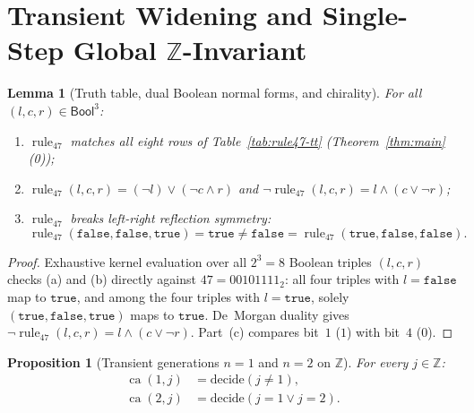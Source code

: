 \documentclass[11pt]{article}
\newtheorem{proposition}[theorem]{Proposition}
\newtheorem{lemma}[theorem]{Lemma}
\theoremstyle{definition}
\newcommand{\Z}{\mathbb{Z}}
\newcommand{\ruleFS}{\operatorname{rule}_{47}}
\newcommand{\ca}{\operatorname{ca}}
\begin{document}
\section{Transient Widening and Single-Step Global \texorpdfstring{$\Z$}{Z}-Invariant}

\begin{lemma}[Truth table, dual Boolean normal forms, and chirality]
\label{lem:rule47}
For all $(l, c, r) \in \mathsf{Bool}^3$:
\begin{enumerate}
\item[\textup{(a)}] $\ruleFS$ matches all eight rows of Table~\ref{tab:rule47-tt} (Theorem~\ref{thm:main}\textup{(0)});
\item[\textup{(b)}] $\ruleFS(l, c, r) = (\neg l) \lor (\neg c \land r)$ and $\neg\ruleFS(l, c, r) = l \land (c \lor \neg r)$;
\item[\textup{(c)}] $\ruleFS$ breaks left-right reflection symmetry:
\[
\ruleFS(\mathtt{false}, \mathtt{false}, \mathtt{true}) = \mathtt{true} \ne \mathtt{false} = \ruleFS(\mathtt{true}, \mathtt{false}, \mathtt{false}).
\]
\end{enumerate}
\end{lemma}

\begin{proof}
Exhaustive kernel evaluation over all $2^3 = 8$ Boolean triples $(l, c, r)$ checks (a) and (b) directly against $47 = 00101111_2$: all four triples with $l = \mathtt{false}$ map to $\mathtt{true}$, and among the four triples with $l = \mathtt{true}$, solely $(\mathtt{true}, \mathtt{false}, \mathtt{true})$ maps to $\mathtt{true}$. De~Morgan duality gives $\neg\ruleFS(l, c, r) = l \land (c \lor \neg r)$. Part~(c) compares bit~$1$ ($1$) with bit~$4$ ($0$).
\end{proof}

\begin{proposition}[Transient generations $n = 1$ and $n = 2$ on $\Z$]
\label{prop:ca-one-two}
For every $j \in \Z$:
\begin{align}
\ca(1, j) &= \mathrm{decide}(j \ne 1), \label{eq:ca-one}\\
\ca(2, j) &= \mathrm{decide}(j = 1 \lor j = 2). \label{eq:ca-two}
\end{align}
\end{proposition}
\end{document}
